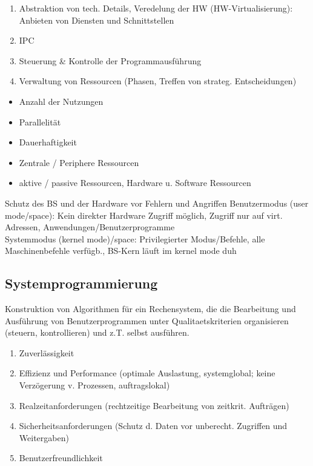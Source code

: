 \begin{enumerate} \setlength\itemsep{0em}
	\item Abstraktion von tech. Details, Veredelung der HW (HW-Virtualisierung): Anbieten von Diensten und Schnittstellen
	\item IPC
	\item Steuerung \& Kontrolle der Programmausführung
	\item Verwaltung von Ressourcen (Phasen, Treffen von strateg. Entscheidungen)
\end{enumerate}

\begin{itemize} \setlength\itemsep{0em}
	\item Anzahl der Nutzungen
	\item Parallelität
	\item Dauerhaftigkeit 
	\item Zentrale / Periphere Ressourcen
	\item aktive / passive Ressourcen, Hardware u. Software Ressourcen 
\end{itemize}

Schutz des BS und der Hardware vor Fehlern und Angriffen
Benutzermodus (user mode/space): Kein direkter Hardware Zugriff möglich, Zugriff nur auf virt. Adressen, Anwendungen/Benutzerprogramme \\ Systemmodus (kernel mode)/space: Privilegierter Modus/Befehle, alle Maschinenbefehle verfügb., BS-Kern läuft im kernel mode duh 



\subsection{Systemprogrammierung}

\noindent Konstruktion von Algorithmen für ein Rechensystem, die die Bearbeitung und Ausführung von Benutzerprogrammen unter Qualitaetskriterien organisieren (steuern, kontrollieren) und z.T. selbst ausführen.

\begin{enumerate}
	\setlength\itemsep{0em}
	\item Zuverlässigkeit
	\item Effizienz und Performance (optimale Auslastung, systemglobal; keine Ver\-zögerung v. Prozessen, auftragslokal)
	\item Realzeitanforderungen (rechtzeitige Bearbeitung von zeitkrit. Aufträgen)
	\item Sicherheitsanforderungen (Schutz d. Daten vor unberecht. Zugriffen und Weiter\-gaben)
	\item Benutzerfreundlichkeit
\end{enumerate}

